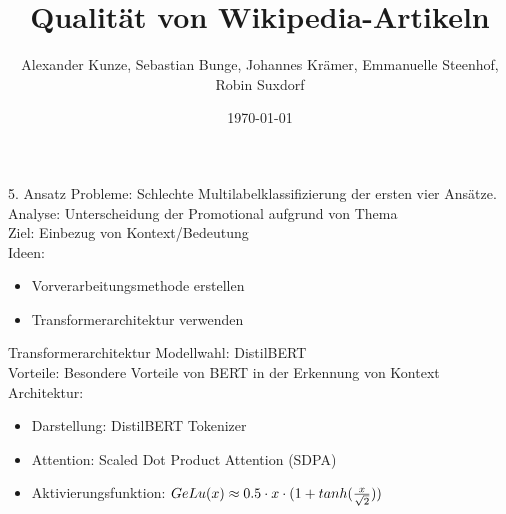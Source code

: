 \documentclass[aspectratio=169]{beamer} %
\title{Qualit\"at von Wikipedia-Artikeln}
\author[]{Alexander Kunze, Sebastian Bunge, Johannes Kr\"amer, Emmanuelle Steenhof, Robin Suxdorf}
\institute{Artificial Intelligence Group,\\
University of Hagen, Germany}
\date{\today}
\begin{document}




\begin{frame}
    \titlepage
\end{frame}
\nologo

\begin{frame}
    \begin{block}{5. Ansatz}
      Probleme: Schlechte Multilabelklassifizierung der ersten vier Ansätze.
      \\Analyse: Unterscheidung der Promotional aufgrund von Thema
      \\Ziel:
      Einbezug von Kontext/Bedeutung
      \\Ideen:
      \begin{itemize}
      \item Vorverarbeitungsmethode erstellen
      \item Transformerarchitektur verwenden
      \end{itemize}      
    \end{block}
 
\end{frame}

\begin{frame}
    \begin{block}{Transformerarchitektur}
     Modellwahl: DistilBERT \\
     Vorteile: Besondere Vorteile von BERT in der Erkennung von Kontext
     \\Architektur:
\begin{itemize}
	\item Darstellung: DistilBERT Tokenizer
     \item Attention: Scaled Dot Product Attention (SDPA)
     \item Aktivierungsfunktion: $GeLu(x) \approx {0.5 \cdot x \cdot (1+ tanh{({x \over {\sqrt{2}}})})} $
     
\end{itemize}        
    \end{block}
 
\end{frame}
\end{document}
